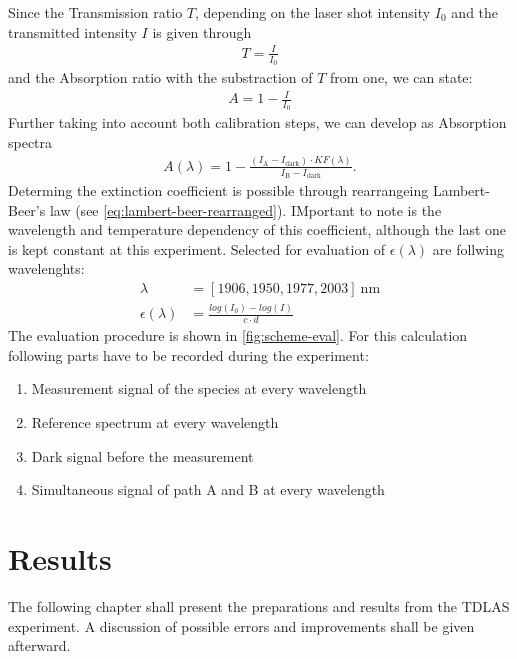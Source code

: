 Since the Transmission ratio $T$, depending on the laser shot intensity $I_\mathrm{0}$ and the transmitted intensity $I$ is given through 
\begin{align}
    T=\frac{I}{I_\mathrm{0}} \nonumber
\end{align}
and the Absorption ratio with the substraction of $T$ from one, we can state:
\begin{align}
    A=1-\frac{I}{I_\mathrm{0}} \nonumber
\end{align}
Further taking into account both calibration steps, we can develop as Absorption spectra
\begin{align}
    A(\lambda)=1-\frac{(I_\mathrm{A} - I_\mathrm{dark}) \cdot KF(\lambda)}{I_\mathrm{B} - I_\mathrm{dark}} \label{eq:absorption-spectrum}.
\end{align}
Determing the extinction coefficient is possible through rearrangeing Lambert-Beer's law (see \autoref{eq:lambert-beer-rearranged}). IMportant to note is the wavelength and temperature dependency of this coefficient, although the last one is kept constant at this experiment. Selected for evaluation of $\epsilon(\lambda)$ are follwing wavelenghts:
\begin{align}
    \lambda&=[1906, 1950, 1977, 2003]~\mathrm{nm} \nonumber \\[6pt]
    \epsilon(\lambda)&=\frac{log(I_\mathrm{0})-log(I)}{c \cdot d} \label{eq:lambert-beer-rearranged}
\end{align}
The evaluation procedure is shown in \autoref{fig:scheme-eval}. For this calculation following parts have to be recorded during the experiment:
\begin{enumerate}
    \item Measurement signal of the species at every wavelength
    \item Reference spectrum at every wavelength
    \item Dark signal before the measurement
    \item Simultaneous signal of path A and B at every wavelength
\end{enumerate}

\chapter{Results}
\label{chap:results}

The following chapter shall present the preparations and results from the TDLAS experiment. A discussion of possible errors and improvements shall be given afterward.

